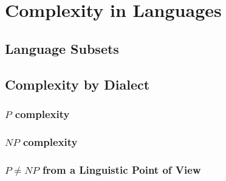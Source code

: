 \section{Complexity in Languages}
\label{sec:complexity}
\subsection{Language Subsets} %
\label{sub:Language Subsets}

\subsection{Complexity by Dialect} %
\label{sub:Complexity by Dialect}
\subsubsection{$P$ complexity} %
\label{ssub:P-complexity}

\subsubsection{$NP$ complexity} %
\label{ssub:NP-complexity}

\subsubsection{$P \neq NP$ from a Linguistic Point of View} %
\label{ssub:PNP from a Linguistic Point of View}



